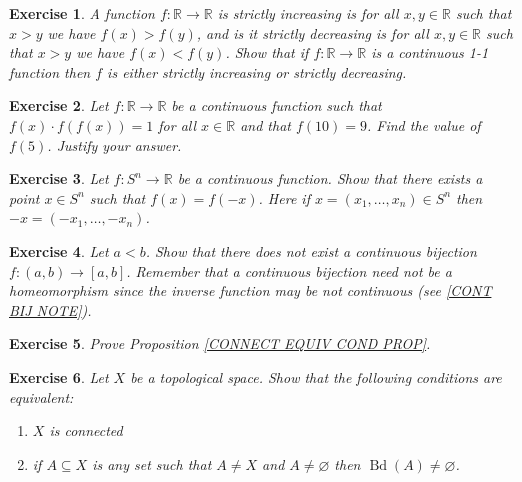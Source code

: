 \documentclass[11pt, letterpaper, oneside]{report}
\theoremstyle{pplain}
\newtheorem{ITERMVALUE THM}[theorem]{Intermediate Value Theorem}
\newtheorem{HEINEBOREL THM}[theorem]{Heine-Borel Theorem}
\newtheorem{UMETR THM}[theorem]{Urysohn Metrization Theorem}
\newtheorem{UMETR2 THM}[theorem]{Urysohn Metrization Theorem (v.2)}
\theoremstyle{ddefinition}
\theoremstyle{nnn}
\newtheorem{TDA NN}[theorem]{Topological Data Analysis. }
\theoremstyle{eexercise}
\newtheorem{exercise}{Exercise}[chapter]
\newcommand{\R}{{\mathbb R}}
\newcommand{\Bd}{\operatorname{Bd}}
\newcommand{\benu}{\begin{enumerate}}
\newcommand{\eenu}{\end{enumerate}}
\begin{document}
\begin{exercise}
A function $f\colon \R\to \R$ is \emph{strictly increasing} is for all $x, y\in \R$ such that $x> y$ we have 
$f(x) > f(y)$, and is it \emph{strictly decreasing} is for all $x, y\in \R$ such that $x> y$ we have 
$f(x) < f(y)$. Show that if $f\colon \R\to\R$ is a continuous 1-1 function then $f$ is either strictly increasing 
or strictly decreasing. 
\end{exercise}






\begin{exercise}
Let $f\colon \R \to \R$ be a continuous function such that $f(x)\cdot f(f(x)) = 1$ for all $x\in \R$ and that 
$f(10) = 9$. Find the value of $f(5)$. Justify your answer.  
\end{exercise}




\begin{exercise}
Let $f\colon S^{n} \to \R$ be a continuous function. Show that there exists a point $x\in S^{n}$
such that $f(x) = f(-x)$. Here if $x = (x_{1}, \dots, x_{n})\in S^{n}$ then $-x = (-x_{1}, \dots, -x_{n})$. 
\end{exercise}





\begin{exercise}
Let $a< b$. Show that there does not exist a continuous bijection $f\colon (a, b) \to [a, b]$. 
Remember  that a continuous bijection need not be a homeomorphism since the inverse function 
may be not continuous (see \ref{CONT BIJ NOTE}).
\end{exercise}




\begin{exercise}
Prove Proposition \ref{CONNECT EQUIV COND PROP}. 
\end{exercise}




\begin{exercise}
Let $X$ be a topological space. Show that the following conditions are equivalent:
\benu
\item $X$ is connected 
\item if $A\subseteq X$ is any set such that $A\neq X$ and $A\neq \varnothing$ then $\Bd(A)\neq \varnothing$. 
\eenu
\end{exercise}
\end{document}
